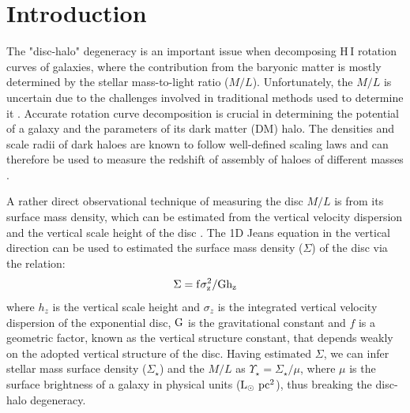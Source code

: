 \documentclass[fleqn,usenatbib]{mnras}
\newcommand{\hi}{{H\,{\small I}}\xspace }
\begin{document}
\section{Introduction}
The "disc-halo" degeneracy is an important issue when decomposing \hi rotation curves of galaxies, where the contribution from the baryonic matter is mostly determined by the stellar mass-to-light ratio ($M/L$). Unfortunately, the $M/L$ is %
uncertain due to the challenges involved in traditional methods used to determine it \citep{vanAlbada, Maraston:2005, Conroy:2009}. Accurate rotation curve decomposition is crucial in determining the potential of a galaxy %
and the parameters of %
its dark matter (DM) halo. The densities and scale radii of dark haloes are known to follow well-defined scaling laws and can therefore be used to measure the redshift of assembly of haloes of different masses \citep{Maccio:13, Kormendy:16, somerville18}.

A rather direct observational technique of measuring the %
disc $M/L$ is from its surface mass density, which can be estimated from the vertical velocity dispersion and the vertical scale height of the disc \citep{VanFree, Bottema:87, HC1, DMI}. The 1D Jeans equation in the vertical direction can be used to estimated the surface mass density ($\Sigma$) of the disc via the relation:
\begin{equation}
 \rm \Sigma = f\sigma_z^2/Gh_z
 \label{main_eq}
\end{equation}
where $h_z$ is the vertical scale height and $\sigma_z$ is the %
integrated vertical velocity dispersion of the exponential disc, $\rm G$ is the gravitational constant and $f$ is a geometric factor, known as the vertical structure constant, that depends weakly on the adopted vertical structure of the disc.
Having estimated $\Sigma$, we can infer stellar mass surface density ($\Sigma_{\star}$) and the $M/L$ as $\Upsilon_{\star} =\Sigma_{\star}/\mu$, where $\mu$ is the surface brightness of a galaxy in physical units ($\rm L_{\odot} %
~pc^2$), thus breaking the disc-halo degeneracy.
\end{document}
